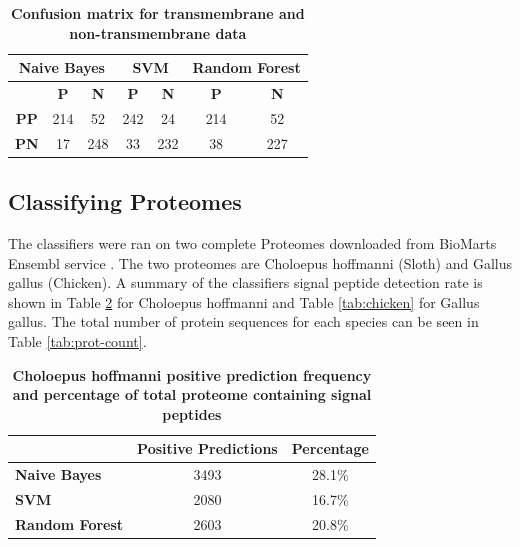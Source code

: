 \documentclass[10pt,letterpaper]{article}
\begin{document}
	\begin{table}[!ht]
		\centering
		\caption{{\bf Confusion matrix for transmembrane and non-transmembrane data }}
		\label{tab:conf-all}
		\begin{tabular}{ccccccc}
			\multicolumn{3}{c}{Naive Bayes}                            & \multicolumn{2}{c}{SVM}                      & \multicolumn{2}{c}{Random Forest} \\ \hline
			& \textbf{P} & \multicolumn{1}{c|}{\textbf{N}} & \textbf{P} & \multicolumn{1}{c|}{\textbf{N}} & \textbf{P}      & \textbf{N}      \\ \hline
			\textbf{PP} & 214        & \multicolumn{1}{c|}{52}         & 242        & \multicolumn{1}{c|}{24}         & 214             & 52              \\
			\textbf{PN} & 17         & \multicolumn{1}{c|}{248}        & 33         & \multicolumn{1}{c|}{232}        & 38              & 227             \\ \hline
		\end{tabular}
	\end{table}
	
	\subsection*{Classifying Proteomes}
	The classifiers were ran on two complete Proteomes downloaded from BioMarts Ensembl service \cite{ensembl}. The two proteomes are Choloepus hoffmanni (Sloth) and Gallus gallus (Chicken). A summary of the classifiers signal peptide detection rate is shown in Table \ref{tab:sloth} for Choloepus hoffmanni and Table \ref{tab:chicken} for Gallus gallus. The total number of protein sequences for each species can be seen in Table \ref{tab:prot-count}.
	
	\begin{table}[!ht]
		\centering
		\caption{{\bf Choloepus hoffmanni positive prediction frequency and percentage of total proteome containing signal peptides}}
		\label{tab:sloth}
		\begin{tabular}{@{}lcc@{}}
			\toprule
			& \multicolumn{1}{l}{Positive Predictions} & \multicolumn{1}{l}{Percentage} \\ \midrule
			\textbf{Naive Bayes}   & 3493                                     & 28.1\%                         \\
			\textbf{SVM}           & 2080                                     & 16.7\%                         \\
			\textbf{Random Forest} & 2603                                     & 20.8\%                        
		\end{tabular}
	\end{table}
	
\end{document}
